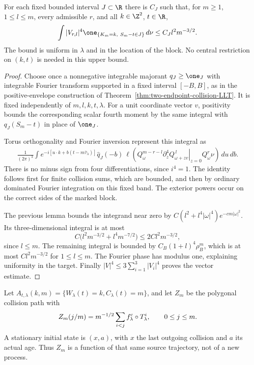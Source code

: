 \begin{proposition}
\label{prop:v36-local-fourth}
For each fixed bounded interval $J\subset\R$ there is $C_J$ such that,
for $m\ge1$, $1\le l\le m$, every admissible $r$, and all $k\in\Z^2$,
$t\in\R$,
\begin{equation}\label{eq:v36-local-fourth}
 \int |V_{r,l}|^4\one_{\{K_m=k,\ S_m-t\in J\}}\,d\nu
                       \le C_J l^2m^{-3/2}.
\end{equation}
The bound is uniform in $\lambda$ and in the location of the block.
No central restriction on $(k,t)$ is needed in this upper bound.
\end{proposition}
\begin{proof}
Choose once a nonnegative integrable majorant $q_J\ge\one_J$ with
integrable Fourier transform supported in a fixed interval $[-B,B]$,
as in the positive-envelope construction of
Theorem~\ref{thm:two-endpoint-collision-LLT}. It is fixed independently
of $m,l,k,t,\lambda$. For a unit coordinate vector $v$, positivity
bounds the corresponding scalar fourth moment by the same integral
with $q_J(S_m-t)$ in place of $\one_J$.

Torus orthogonality and Fourier inversion represent this integral as
\begin{align*}
 \frac1{(2\pi)^3}\int e^{-i[u\cdot k+b(t-m\bar\tau_\lambda)]}
 \widehat q_J(-b)\,
 \ell\left(Q_\omega^{m-r-l}
       \left.\partial_z^4Q_{\omega+zv}^{\,l}\right|_{z=0}
                         Q_\omega^r\nu\right)\,du\,db.
\end{align*}
There is no minus sign from four differentiations, since $i^4=1$.
The identity follows first for finite collision sums, which are
bounded, and then by ordinary dominated Fourier integration on this
fixed band. The exterior powers occur on the correct sides of the
marked block.

The previous lemma bounds the integrand near zero by
$C(l^2+l^4|\omega|^4)e^{-cm|\omega|^2}$.
Its three-dimensional integral is at most
\[
 C\bigl(l^2m^{-3/2}+l^4m^{-7/2}\bigr)
                      \le 2C l^2m^{-3/2},
\]
since $l\le m$. The remaining integral is bounded by
$C_B(1+l)^4\rho_B^m$, which is at most $C l^2m^{-3/2}$
for $1\le l\le m$. The Fourier phase has modulus one, explaining
uniformity in the target. Finally
$|V|^4\le3\sum_{i=1}^3|V_i|^4$ proves the vector estimate.
\end{proof}

Let $A_{t,\lambda}(k,m)=\{W_\lambda(t)=k,C_\lambda(t)=m\}$, and let
$Z_m$ be the polygonal collision path with
\[
 Z_m(j/m)=m^{-1/2}\sum_{i<j}f_\lambda^{\rm c}\circ T_\lambda^i,
                           \qquad 0\le j\le m.
\]
A stationary initial state is $(x,a)$, with $x$ the last outgoing
collision and $a$ its actual age. Thus $Z_m$ is a function of that
same source trajectory, not of a new process.

